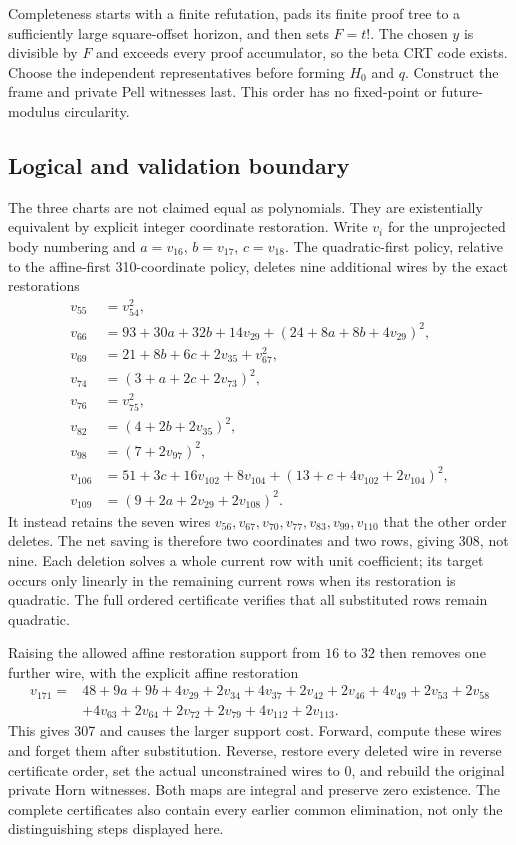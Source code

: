 Completeness starts with a finite refutation, pads its finite proof tree to
a sufficiently large square-offset horizon, and then sets $F=t!$.
The chosen $y$ is divisible by $F$ and exceeds every proof accumulator, so
the beta CRT code exists. Choose the independent representatives before
forming $H_0$ and $q$. Construct the frame and private Pell witnesses last.
This order has no fixed-point or future-modulus circularity.

\subsection{Logical and validation boundary}
The three charts are not claimed equal as polynomials. They are existentially
equivalent by explicit integer coordinate restoration. Write $v_i$ for the
unprojected body numbering and $a=v_{16}$, $b=v_{17}$, $c=v_{18}$.
The quadratic-first policy, relative to the affine-first 310-coordinate
policy, deletes nine additional wires by the exact restorations
\begin{align*}
 v_{55}&=v_{54}^2,\\
 v_{66}&=93+30a+32b+14v_{29}+(24+8a+8b+4v_{29})^2,\\
 v_{69}&=21+8b+6c+2v_{35}+v_{67}^2,\\
 v_{74}&=(3+a+2c+2v_{73})^2,\\
 v_{76}&=v_{75}^2,\\
 v_{82}&=(4+2b+2v_{35})^2,\\
 v_{98}&=(7+2v_{97})^2,\\
 v_{106}&=51+3c+16v_{102}+8v_{104}
             +(13+c+4v_{102}+2v_{104})^2,\\
 v_{109}&=(9+2a+2v_{29}+2v_{108})^2.
\end{align*}
It instead retains the seven wires
$v_{56},v_{67},v_{70},v_{77},v_{83},v_{99},v_{110}$ that the other
order deletes. The net saving is therefore two coordinates and two rows,
giving 308, not nine. Each deletion solves a whole current row with unit
coefficient; its target occurs only linearly in the remaining current rows
when its restoration is quadratic. The full ordered certificate verifies
that all substituted rows remain quadratic.

Raising the allowed affine restoration support from $16$ to $32$ then removes
one further wire, with the explicit affine restoration
\begin{align*}
v_{171}={}&48+9a+9b+4v_{29}+2v_{34}+4v_{37}+2v_{42}+2v_{46}
 +4v_{49}+2v_{53}+2v_{58}\\
 &+4v_{63}+2v_{64}+2v_{72}+2v_{79}+4v_{112}+2v_{113}.
\end{align*}
This gives 307 and causes the larger support cost. Forward, compute these
wires and forget them after substitution. Reverse, restore every deleted
wire in reverse certificate order, set the actual unconstrained wires to $0$,
and rebuild the original private Horn witnesses. Both maps are integral and
preserve zero existence. The complete certificates also contain every earlier
common elimination, not only the distinguishing steps displayed here.

